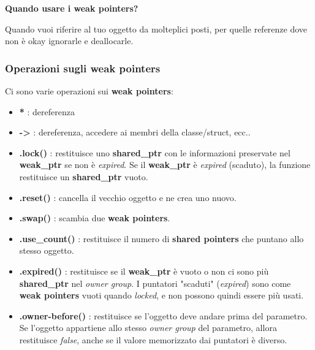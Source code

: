\textsf{\small \textbf{Quando usare i weak pointers?}} \break

\textsf{\small Quando vuoi riferire al tuo oggetto da molteplici posti, per quelle referenze dove non è okay ignorarle e deallocarle.} \\


\subsubsection{Operazioni sugli weak pointers}

\textsf{\small Ci sono varie operazioni sui \textbf{weak pointers}: } \\

\begin{itemize}
	\item \textsf{\small \textbf{*} : dereferenza}
	\item \textsf{\small \textbf{->} : dereferenza, accedere ai membri della classe/struct, ecc..}
	\item \textsf{\small \textbf{.lock()} : restituisce uno \textbf{shared\_ptr} con le informazioni preservate nel \textbf{weak\_ptr} se non è \emph{expired}. Se il \textbf{weak\_ptr} è \emph{expired} (scaduto), la funzione restituisce un \textbf{shared\_ptr} vuoto.}
	\item \textsf{\small \textbf{.reset()} : cancella il vecchio oggetto e ne crea uno nuovo.}
	\item \textsf{\small \textbf{.swap()} : scambia due \textbf{weak pointers}.}
	\item \textsf{\small \textbf{.use\_count()} : restituisce il numero di \textbf{shared pointers} che puntano allo stesso oggetto.}
	\item \textsf{\small \textbf{.expired()} : restituisce se il \textbf{weak\_ptr} è vuoto o non ci sono più \textbf{shared\_ptr} nel \emph{owner group}. I puntatori "scaduti" (\emph{expired}) sono come \textbf{weak pointers} vuoti quando \emph{locked}, e non possono quindi essere più usati.}
	\item \textsf{\small \textbf{.owner-before()} : restituisce se l'oggetto deve andare prima del parametro. Se l'oggetto appartiene allo stesso \emph{owner group} del parametro, allora restituisce \emph{false}, anche se il valore memorizzato dai puntatori è diverso.}
\end{itemize}

